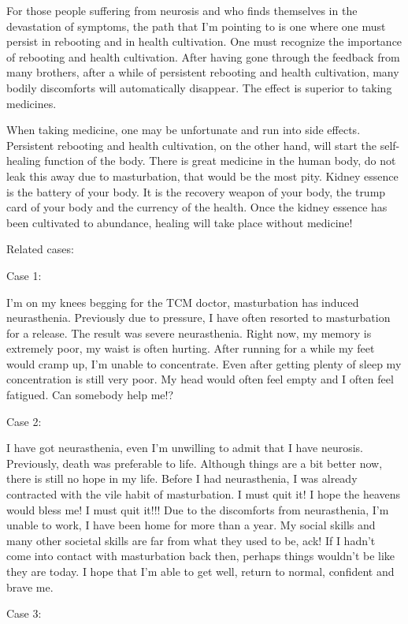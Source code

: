 \documentclass[
]{book}
\begin{document}
For those people suffering from neurosis and who finds themselves in the devastation of symptoms, the path that I'm pointing to is one where one must persist in rebooting and in health cultivation. One must recognize the importance of rebooting and health cultivation. After having gone through the feedback from many brothers, after a while of persistent rebooting and health cultivation, many bodily discomforts will automatically disappear. The effect is superior to taking medicines.

When taking medicine, one may be unfortunate and run into side effects. Persistent rebooting and health cultivation, on the other hand, will start the self-healing function of the body. There is great medicine in the human body, do not leak this away due to masturbation, that would be the most pity. Kidney essence is the battery of your body. It is the recovery weapon of your body, the trump card of your body and the currency of the health. Once the kidney essence has been cultivated to abundance, healing will take place without medicine!

Related cases:

Case 1:

I'm on my knees begging for the TCM doctor, masturbation has induced neurasthenia. Previously due to pressure, I have often resorted to masturbation for a release. The result was severe neurasthenia. Right now, my memory is extremely poor, my waist is often hurting. After running for a while my feet would cramp up, I'm unable to concentrate. Even after getting plenty of sleep my concentration is still very poor. My head would often feel empty and I often feel fatigued. Can somebody help me!?

Case 2:

I have got neurasthenia, even I'm unwilling to admit that I have neurosis. Previously, death was preferable to life. Although things are a bit better now, there is still no hope in my life. Before I had neurasthenia, I was already contracted with the vile habit of masturbation. I must quit it! I hope the heavens would bless me! I must quit it!!! Due to the discomforts from neurasthenia, I'm unable to work, I have been home for more than a year. My social skills and many other societal skills are far from what they used to be, ack! If I hadn't come into contact with masturbation back then, perhaps things wouldn't be like they are today. I hope that I'm able to get well, return to normal, confident and brave me.

Case 3:
\end{document}
